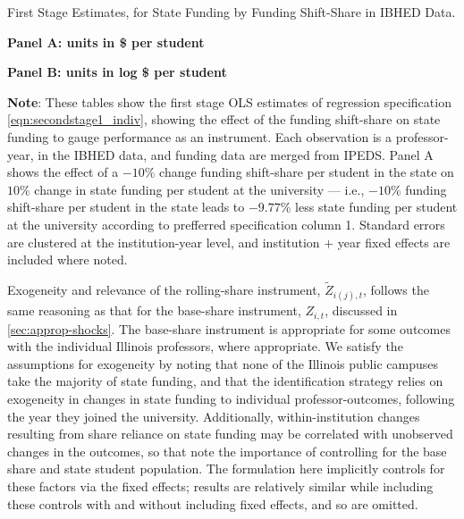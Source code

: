 \begin{table}[h!]
    \singlespacing
    \centering
    \caption{First Stage Estimates, for State Funding by Funding Shift-Share in IBHED Data.}
    \textbf{Panel A: units in \$ per student}
    
    \makebox[\textwidth][c]{}
    
    \textbf{Panel B: units in log \$ per student}
    
    \makebox[\textwidth][c]{}
    
    \label{tab:firststage-illinois}
    \justify
    \footnotesize
    \textbf{Note}:
    These tables show the first stage OLS estimates of regression specification \eqref{eqn:secondstage1_indiv}, showing the effect of the funding shift-share on state funding to gauge performance as an instrument.
    Each observation is a professor-year, in the IBHED data, and funding data are merged from IPEDS.
    Panel A shows the effect of a $-10$\% change funding shift-share per student in the state on $10$\% change in state funding per student at the university --- i.e.,
    $-10$\% funding shift-share per student in the state leads to $-9.77$\% less state funding per student at the university according to prefferred specification column 1.        
    Standard errors are clustered at the institution-year level, and institution $+$ year fixed effects are included where noted.
\end{table}

Exogeneity and relevance of the rolling-share instrument, $\tilde Z_{i(j),t}$, follows the same reasoning as that for the base-share instrument, $Z_{i,t}$, discussed in \autoref{sec:approp-shocks}.
The base-share instrument is appropriate for some outcomes with the individual Illinois professors, where appropriate.
We satisfy the assumptions for exogeneity by noting that none of the Illinois public campuses take the majority of state funding, and that the identification strategy relies on exogeneity in changes in state funding to individual professor-outcomes, following the year they joined the university.
Additionally, within-institution changes resulting from share reliance on state funding may be correlated with unobserved changes in the outcomes, so that \cite{NBERw27885} note the importance of controlling for the base share and state student population.
The formulation here implicitly controls for these factors via the fixed effects; results are relatively similar while including these controls with and without including fixed effects, and so are omitted.

